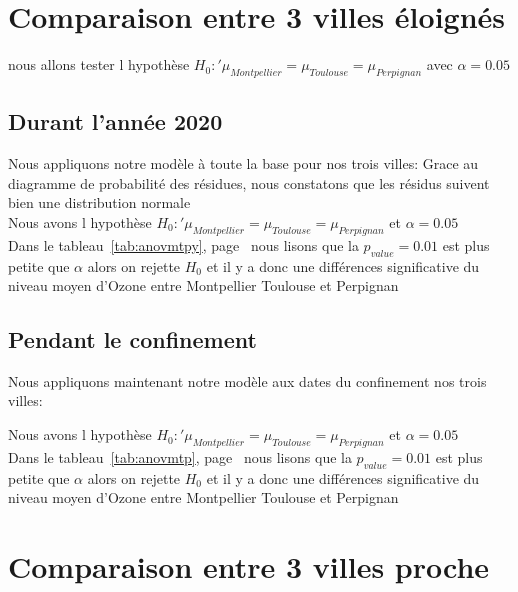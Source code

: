 \documentclass[a4paper,11pt,twoside,openright]{report}
\theoremstyle{plain}
\theoremstyle{definition}
\theoremstyle{remark}
\begin{document}
\section{Comparaison entre 3 villes éloignés}
\label{sec:Comparaison entre  3 villes éloignés}

nous allons tester l hypothèse  $H_0 :'\mu_{Montpellier}=\mu_{Toulouse}=\mu_{Perpignan}$ avec $\alpha=0.05$\\


\subsection{Durant l'année 2020}
\label{sec:Durant l'année 2020}

Nous appliquons notre modèle à toute la base pour nos trois villes: 
Grace au diagramme de probabilité des résidues, nous constatons que les résidus suivent bien une distribution normale \\

Nous avons l hypothèse  $H_0 :'\mu_{Montpellier}=\mu_{Toulouse}=\mu_{Perpignan}$ et $\alpha=0.05$\\

Dans le tableau~\ref{tab:anovmtpy}, page~\pageref{tab:anovmtpy} nous lisons que la $p_{value} = 0.01$ est plus petite que $\alpha$ alors on rejette $H_0$  et il y a donc une différences significative du niveau moyen d'Ozone entre Montpellier Toulouse et Perpignan


\subsection{Pendant le confinement}
\label{sec:pendant le confinement }

Nous appliquons maintenant notre modèle aux dates du confinement nos trois villes: 


Nous avons l hypothèse  $H_0 :'\mu_{Montpellier}=\mu_{Toulouse}=\mu_{Perpignan}$ et $\alpha=0.05$\\

Dans le tableau~\ref{tab:anovmtp}, page~\pageref{tab:anovmtp} nous lisons que la $p_{value} = 0.01$ est plus petite que $\alpha$ alors on rejette $H_0$  et il y a donc une différences significative du niveau moyen d'Ozone entre Montpellier Toulouse et Perpignan



\section{Comparaison entre 3 villes proche}
\label{sec:Comparaison entre 3 villes proche}
\end{document}

